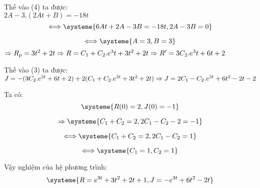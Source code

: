     Thế vào (4) ta được:\\

    $2A-3.(2At+B)=-18t$ \\

    \begin{equation}
        \Longleftrightarrow
        \systeme{
            6At+2A-3B=-18t,
            2A - 3B = 0
        }\label{eq:equation2}
    \end{equation}

    \begin{equation}
        \Longleftrightarrow
        \systeme{
            A = 3,
            B = 3
        }\label{eq:equation2}
    \end{equation}
    $\Rightarrow R_p=3t^2+2t \\
    \Rightarrow R=C_1+C_2.e^3t+3t^2+2t \\
    \Rightarrow R'=3C_2.e^3t+6t+2 \\$

    Thế vào (3) ta được: \\

    $J=-(3C_2.e^{3t}+6t+2)+2(C_1+C_2.e^{3t}+3t^2+2t) \\
    \Rightarrow J=2C_1-C_2.e^{3t}+6t^2-2t-2
    $

    Ta có: \\

    \begin{equation}
        \systeme{
            R(0) = 2,
            J(0) = -1
        }\label{eq:equation2}
    \end{equation}

    \begin{equation}
        \Rightarrow
        \systeme{
            C_1 + C_2 = 2,
            2C_1 - C_2 -2 = -1
        }\label{eq:equation2}
    \end{equation}

    \begin{equation}
        \Longleftrightarrow
        \systeme{
            C_1 + C_2 = 2,
            2C_1 - C_2 =1
        }\label{eq:equation2}
    \end{equation}

    \begin{equation}
        \Longleftrightarrow
        \systeme{
            C_1 = 1,
            C_2 = 1
        }\label{eq:equation2}
    \end{equation}

    Vậy nghiệm của hệ phương trình:
    \begin{equation}
        \systeme{
            R = e^{3t}+3t^2+2t+1,
            J = -e^{3t}+6t^2-2t
        }\label{eq:equation2}
    \end{equation}

